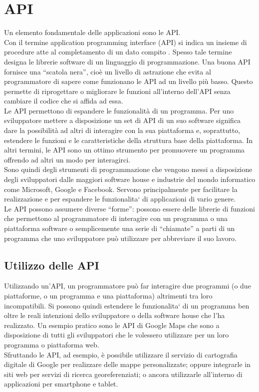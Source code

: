 \section{API}
Un elemento fondamentale delle applicazioni sono le API.
\\Con il termine application programming interface (API) si indica un insieme di procedure atte al completamento di un dato compito \cite{api}. Spesso tale termine designa le librerie software di un linguaggio di programmazione. Una buona API fornisce una “scatola nera”, cioè un livello di astrazione che evita al programmatore di sapere come funzionano le API ad un livello più basso. Questo permette di riprogettare o migliorare le funzioni all’interno dell’API senza cambiare il codice che si affida ad essa.
\\Le API permettono di espandere le funzionalità di un programma. Per uno sviluppatore mettere a disposizione un set di API di un suo software significa dare la possibilità ad altri di interagire con la sua piattaforma e, soprattutto, estendere le funzioni e le caratteristiche della struttura base della piattaforma. In altri termini, le API sono un ottimo strumento per promuovere un programma offrendo ad altri un modo per interagirci.
\\Sono quindi degli strumenti di programmazione che vengono messi a disposizione degli sviluppatori dalle maggiori software house e industrie del mondo informatico come Microsoft, Google e Facebook. Servono principalmente per facilitare la realizzazione e per espandere le funzionalita` di applicazioni di vario genere. 
\\Le API possono assumere diverse “forme”: possono essere delle librerie di funzioni che permettono al programmatore di interagire con un programma o una piattaforma software o semplicemente una serie di “chiamate” a parti di un programma che uno sviluppatore può utilizzare per abbreviare il suo lavoro.

\subsection{Utilizzo delle API}
Utilizzando un’API, un programmatore può far interagire due programmi (o due piattaforme, o un programma e una piattaforma) altrimenti tra loro incompatibili. Si possono quindi estendere le funzionalita` di un programma ben oltre le reali intenzioni dello sviluppatore o della software house che l’ha realizzato. Un esempio pratico sono le API di Google Maps che sono a disposizione di tutti gli sviluppatori che le volessero utilizzare per un loro programma o piattaforma web. 
\\Sfruttando le API, ad esempio, è possibile utilizzare il servizio di cartografia digitale di Google per realizzare delle mappe personalizzate; oppure integrarle in siti web per servizi di ricerca georeferenziati; o ancora utilizzarle all’interno di applicazioni per smartphone e tablet.
